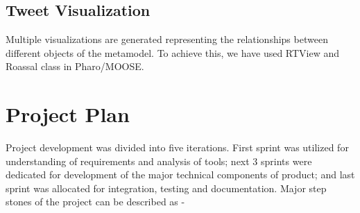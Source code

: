 \documentclass[11pt]{article}
\begin{document}
\subsection{Tweet Visualization}
Multiple visualizations are generated representing the relationships between different objects of the metamodel. To achieve this, we have used RTView and Roassal class in Pharo/MOOSE.

\section{Project Plan}
Project development was divided into five iterations. First sprint was utilized for understanding of requirements and analysis of tools; next 3 sprints were dedicated for development of the major technical components of product; and last sprint was allocated for integration, testing and documentation. Major step stones of the project can be described as - 
\end{document}
